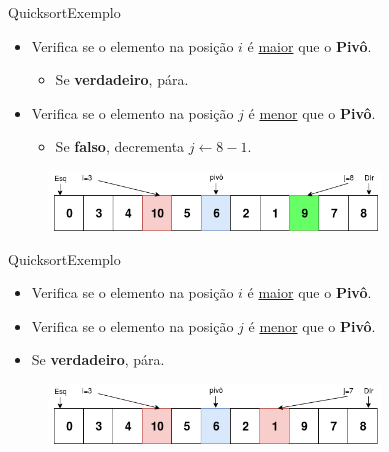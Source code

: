 \documentclass[aspectratio=169]{beamer}
\begin{document}

\begin{frame}{Quicksort}{Exemplo}
\begin{itemize}
 \item Verifica se o elemento na posição $i$ é \underline{maior} que o {\bf Pivô}.
 \begin{itemize}
  \item Se {\bf verdadeiro}, pára.
 \end{itemize}
 \item Verifica se o elemento na posição $j$ é \underline{menor} que o {\bf Pivô}.
 \begin{itemize}
 \item Se {\bf falso}, decrementa $j \leftarrow 8 - 1$.
 \end{itemize}
\end{itemize}

\begin{figure}[!h]
  \centering
  \includegraphics[width=250pt]{imgs/quick/quick8.png}
  \label{fig_quick8}
\end{figure}
\end{frame}


\begin{frame}{Quicksort}{Exemplo}
\begin{itemize}
 \item Verifica se o elemento na posição $i$ é \underline{maior} que o {\bf Pivô}.
 \item Verifica se o elemento na posição $j$ é \underline{menor} que o {\bf Pivô}.
 \item Se {\bf verdadeiro}, pára.
\end{itemize}
\begin{figure}[!h]
  \centering
  \includegraphics[width=250pt]{imgs/quick/quick9.png}
  \label{fig_quick9}
\end{figure}
\end{frame}

\end{document}
